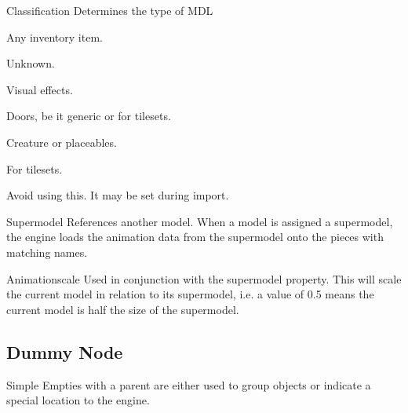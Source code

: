 \begin{propertyAurora}{Classification}
Determines the type of MDL
\begin{description}[leftmargin=6em,style=nextline]
    \item[Item] Any inventory item.
    \item[GUI] Unknown.
    \item[Effect] Visual effects.
    \item[Door] Doors, be it generic or for tilesets.
    \item[Character] Creature or placeables. 
    \item[Tile] For tilesets.
    \item[Unknown] Avoid using this. It may be set during import.
\end{description}
\end{propertyAurora}




\begin{propertyAurora}{Supermodel}
References another model. When a model is assigned a supermodel, 
the engine loads the animation data from the supermodel onto the 
pieces with matching names.
\end{propertyAurora}

\begin{propertyAurora}{Animationscale}
Used in conjunction with the supermodel property. This will scale the current model in relation to 
its supermodel, i.e. a value of 0.5 means the current model is half the size of the supermodel.
\end{propertyAurora}

\subsection{Dummy Node}
\begin{minipage}[t]{0.65\textwidth}
    Simple Empties with a parent are either used to group objects or
    indicate a special location to the engine. \\
\end{minipage}\hfill
\begin{minipage}[t]{0.3\textwidth}
    \centering{}
    \label{fig1}
\end{minipage}



